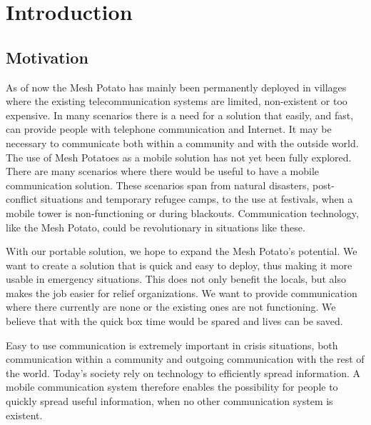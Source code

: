 \chapter{Introduction}
\label{chp:introduction} 

\section{Motivation}
As of now the Mesh Potato has mainly been permanently deployed in villages where the existing telecommunication systems are limited, non-existent or too expensive. In many scenarios there is a need for a solution that easily, and fast, can provide people with telephone communication and Internet. It may be necessary to communicate both within a community and with the outside world. The use of Mesh Potatoes as a mobile solution has not yet been fully explored. There are many scenarios where there would be useful to have a mobile communication solution. These scenarios span from natural disasters, post-conflict situations and temporary refugee camps, to the use at festivals, when a mobile tower is non-functioning or during blackouts. Communication technology, like the Mesh Potato, could be revolutionary in situations like these. 

With our portable solution, we hope to expand the Mesh Potato's potential. We want to create a solution that is quick and easy to deploy, thus making it more usable in emergency situations. This does not only benefit the locals, but also makes the job easier for relief organizations. We want to provide communication where there currently are none or the existing ones are not functioning. We believe that with the \gls{quick} box time would be spared and lives can be saved. 

Easy to use communication is extremely important in crisis situations, both communication within a community and outgoing communication with the rest of the world. Today's society rely on technology to efficiently spread information. A mobile communication system therefore enables the possibility for people to quickly spread useful information, when no other communication system is existent. 


